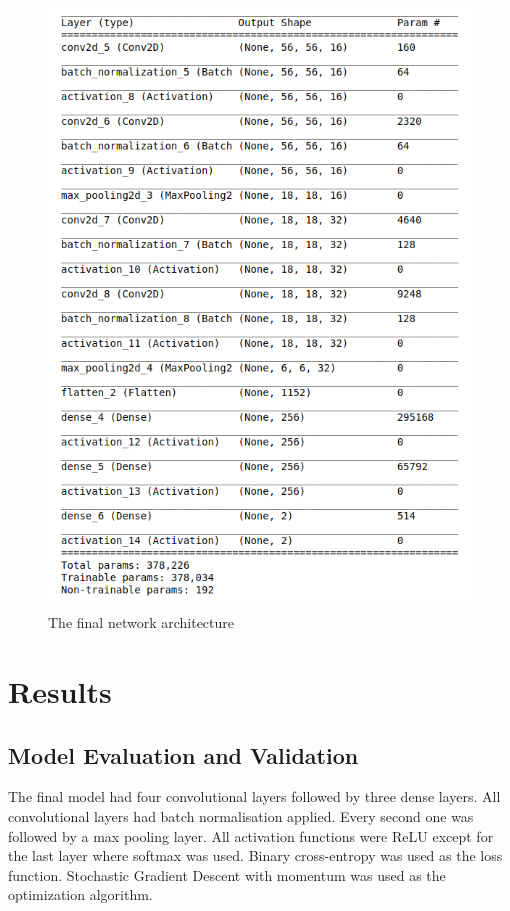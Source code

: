\documentclass[a4paper]{article}
\begin{document}
    \begin{figure}[H]
        \centering
            \includegraphics[width=\textwidth,height=16cm,keepaspectratio]{cnn_summary.png}
        \caption{The final network architecture}
    \end{figure}
    
    \pagebreak
    \section*{Results}
    
    \subsection*{Model Evaluation and Validation}
    
    The final model had four convolutional layers followed by three dense layers. All convolutional layers had batch
    normalisation applied. Every second one was followed by a max pooling layer. All activation functions were ReLU
    except for the last layer where softmax was used. Binary cross-entropy was used as the loss function. Stochastic
    Gradient Descent with momentum was used as the optimization algorithm.
    
\end{document}
